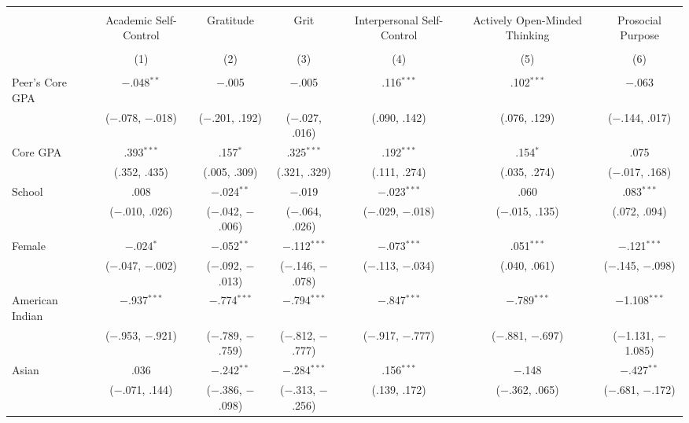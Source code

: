 
\begin{table}[!htbp] \centering 
  \caption{} 
  \label{} 
\footnotesize 
\begin{tabular}{@{\extracolsep{5pt}}lcccccc} 
\\[-1.8ex]\hline \\[-1.8ex] 
 & Academic Self-Control & Gratitude & Grit & Interpersonal Self-Control & Actively Open-Minded Thinking & Prosocial Purpose \\ 
\\[-1.8ex] & (1) & (2) & (3) & (4) & (5) & (6)\\ 
\hline \\[-1.8ex] 
 Peer's Core GPA & $-$.048$^{**}$ & $-$.005 & $-$.005 & .116$^{***}$ & .102$^{***}$ & $-$.063 \\ 
  & ($-$.078, $-$.018) & ($-$.201, .192) & ($-$.027, .016) & (.090, .142) & (.076, .129) & ($-$.144, .017) \\ 
  Core GPA & .393$^{***}$ & .157$^{*}$ & .325$^{***}$ & .192$^{***}$ & .154$^{*}$ & .075 \\ 
  & (.352, .435) & (.005, .309) & (.321, .329) & (.111, .274) & (.035, .274) & ($-$.017, .168) \\ 
  School & .008 & $-$.024$^{**}$ & $-$.019 & $-$.023$^{***}$ & .060 & .083$^{***}$ \\ 
  & ($-$.010, .026) & ($-$.042, $-$.006) & ($-$.064, .026) & ($-$.029, $-$.018) & ($-$.015, .135) & (.072, .094) \\ 
  Female & $-$.024$^{*}$ & $-$.052$^{**}$ & $-$.112$^{***}$ & $-$.073$^{***}$ & .051$^{***}$ & $-$.121$^{***}$ \\ 
  & ($-$.047, $-$.002) & ($-$.092, $-$.013) & ($-$.146, $-$.078) & ($-$.113, $-$.034) & (.040, .061) & ($-$.145, $-$.098) \\ 
  American Indian & $-$.937$^{***}$ & $-$.774$^{***}$ & $-$.794$^{***}$ & $-$.847$^{***}$ & $-$.789$^{***}$ & $-$1.108$^{***}$ \\ 
  & ($-$.953, $-$.921) & ($-$.789, $-$.759) & ($-$.812, $-$.777) & ($-$.917, $-$.777) & ($-$.881, $-$.697) & ($-$1.131, $-$1.085) \\ 
  Asian & .036 & $-$.242$^{**}$ & $-$.284$^{***}$ & .156$^{***}$ & $-$.148 & $-$.427$^{**}$ \\ 
  & ($-$.071, .144) & ($-$.386, $-$.098) & ($-$.313, $-$.256) & (.139, .172) & ($-$.362, .065) & ($-$.681, $-$.172) \\ 

\end{tabular}
\end{table}
